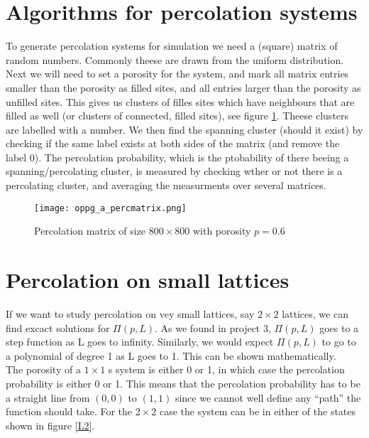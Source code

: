 \documentclass[a4paper,english, 10pt, twoside]{article}
\begin{document}
\section{Algorithms for percolation systems}
To generate percolation systems for simulation we need a (square) matrix of random numbers. Commonly theese are drawn from the 
uniform distribution. Next we will need to set a porosity for the system, and mark all matrix entries smaller than the porosity 
as filled sites, and all entries larger than the porosity as unfilled sites. This gives us clusters of filles sites which have 
neighbours that are filled as well (or clusters of connected, filled sites), see figure \ref{perc_matrix}. Theese clusters are labelled with a number.
We then find the spanning cluster (should it exist) by checking if the same label exists at both sides of the matrix (and remove the label 0). 
The percolation probability, which is the ptobability of there beeing a spanning/percolating cluster, is measured by checking wther or not there is 
a percolating cluster, and averaging the measurments over several matrices.

\begin{figure}[H]
\centering
\texttt{[image: oppg\_a\_percmatrix.png]}
\caption{Percolation matrix of size $800\times800$ with porosity $p=0.6$}
\label{perc_matrix}
\end{figure}

\section{Percolation on small lattices}
If we want to study percolation on vey small lattices, say $2\times2$ lattices, we can find excact solutions for $\Pi(p,L)$. As we found 
in project 3, $\Pi(p,L)$ goes to a step function as L goes to infinity. Similarly, we would expect $\Pi(p,L)$ to go to a polynomial of 
degree 1 as L goes to 1. This can be shown mathematically.\\
The porosity of a $1\times1$ s system is either 0 or 1, in which case the percolation probability is either 0 or 1. This means that the 
percolation probability has to be a straight line from $(0,0)$ to $(1,1)$ since we cannot well define any ``path'' the function should take.
For the $2\times2$ case the system can be in either of the states shown in figure \ref{L2}.
\end{document}
